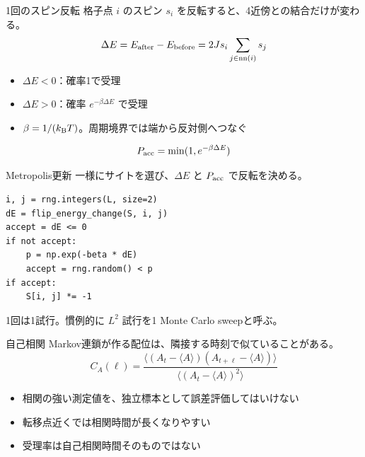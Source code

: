\documentclass[12pt,aspectratio=43]{beamer}
\begin{document}
\begin{frame}[t]{1回のスピン反転}
  格子点 $i$ のスピン $s_i$ を反転すると、4近傍との結合だけが変わる。
  \[
    \Delta E=E_{\rm after}-E_{\rm before}
      =2J s_i\sum_{j\in\mathrm{nn}(i)}s_j
  \]
  \vspace{-1mm}
  \begin{itemize}
    \setlength{\itemsep}{1.5mm}
    \item $\Delta E<0$：確率1で受理
    \item $\Delta E>0$：確率 $e^{-\beta\Delta E}$ で受理
    \item $\beta=1/(k_{\rm B}T)$。周期境界では端から反対側へつなぐ
  \end{itemize}
  \[
    P_{\rm acc}=\min(1,e^{-\beta\Delta E})
  \]
\end{frame}

\begin{frame}[t,fragile]{Metropolis更新}
  \small 一様にサイトを選び、$\Delta E$ と $P_{\rm acc}$ で反転を決める。
  \vspace{1mm}
  \begin{lstlisting}
i, j = rng.integers(L, size=2)
dE = flip_energy_change(S, i, j)
accept = dE <= 0
if not accept:
    p = np.exp(-beta * dE)
    accept = rng.random() < p
if accept:
    S[i, j] *= -1
  \end{lstlisting}
  \small 1回は1試行。慣例的に $L^2$ 試行を1 Monte Carlo sweepと呼ぶ。
\end{frame}

\begin{frame}[t]{自己相関}
  Markov連鎖が作る配位は、隣接する時刻で似ていることがある。
  \[
    C_A(\ell)=\frac{\langle(A_t-\langle A\rangle)
      (A_{t+\ell}-\langle A\rangle)\rangle}
      {\langle(A_t-\langle A\rangle)^2\rangle}
  \]
  \begin{itemize}
    \setlength{\itemsep}{2mm}
    \item 相関の強い測定値を、独立標本として誤差評価してはいけない
    \item 転移点近くでは相関時間が長くなりやすい
    \item 受理率は自己相関時間そのものではない
  \end{itemize}
\end{frame}
\end{document}
